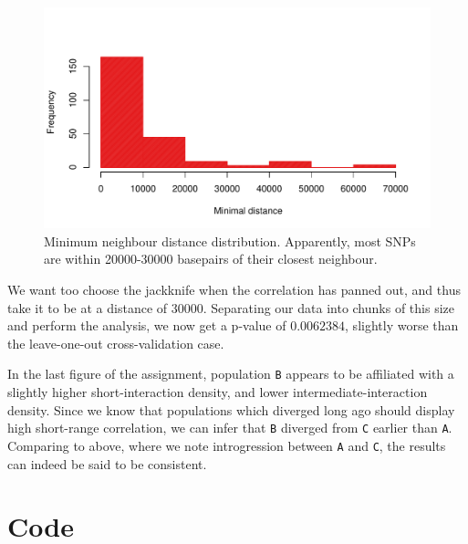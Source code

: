 \documentclass[10pt]{article}\usepackage[]{graphicx}\usepackage[]{color}
\makeatletter
\def\maxwidth{ %
  \ifdim\Gin@nat@width>\linewidth
    \linewidth
  \else
    \Gin@nat@width
  \fi
}
\theoremstyle{plain}
\newcommand{\A}{\texttt{A}\xspace}
\newcommand{\B}{\texttt{B}\xspace}
\renewcommand{\C}{\texttt{C}\xspace}
\makeatother
\begin{document}
\begin{multicols*}{2}
\begin{Schunk}
\begin{figure}[H]
{\centering \includegraphics[width=\maxwidth]{figure/twocolumn-3_distances-1} 

}

\caption[Minimum neighbour distance distribution]{Minimum neighbour distance distribution. Apparently, most SNPs are within 20000-30000 basepairs of their closest neighbour.}\label{fig:3_distances}
\end{figure}
\end{Schunk}



We want too choose the jackknife when the correlation has panned out, and thus take it to be at a distance of 30000. Separating our data into chunks of this size and perform the analysis, we now get a p-value of $0.0062384$, slightly worse than the  leave-one-out cross-validation case.

In the last figure of the assignment, population \B appears to be affiliated with a slightly higher short-interaction density, and lower intermediate-interaction density. Since we know that populations which diverged long ago should display high short-range correlation, we can infer that \B diverged from \C earlier than \A. Comparing to above, where we note introgression between \A and \C, the results can indeed be said to be consistent. 


\end{multicols*}

\newpage
\onecolumn
  \appendix
\section{Code}
   
   
   
\end{document}
